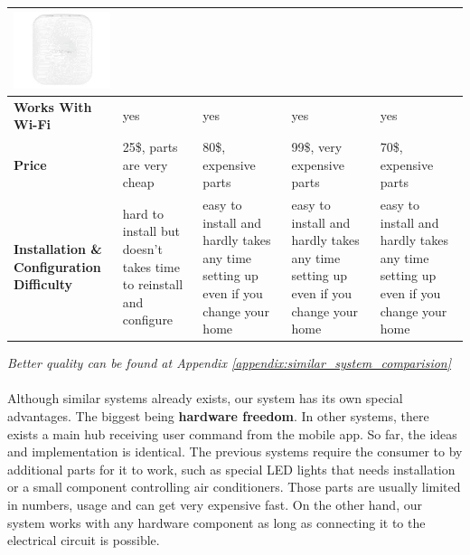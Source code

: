 \documentclass[12pt, oneside, a4paper]{book}
\newcommand\boldcolor[1]{\textcolor{bold}{\textbf{#1}}}
\begin{document}
\begin{table}[H]
\begin{center}
\begin{tabularx}{1\linewidth}{|m{2.2cm}*4{|X}|}
						\includegraphics[width=\linewidth]{img/samsung_hw.png}
					 \\\hline
					\boldcolor{Works With Wi-Fi} & yes & yes & yes & yes  \\\hline

					\boldcolor{Price} & 25\$, parts are very cheap & 80\$, expensive parts & 99\$, very expensive parts & 70\$, expensive parts \\\hline
					
					\boldcolor{Installation \& Configuration Difficulty} & hard to install but doesn't takes time to reinstall and configure& easy to install and hardly takes any time setting up even if you change your home  & easy to install and hardly takes any time setting up even if you change your home  & easy to install and hardly takes any time setting up even if you change your home
					\\\hline
				\end{tabularx}
			\end{center}
		\end{table}
		\textit{Better quality can be found at Appendix \ref{appendix:similar_system_comparision}}
		\newpage
		\paragraph{} Although similar systems already exists, our system has its own special advantages. The biggest being \textbf{hardware freedom}. In other systems, there exists a main hub receiving user command from the mobile app. So far, the ideas and implementation is identical. The previous systems require the consumer to by additional parts for it to work, such as special LED lights that needs installation or a small component controlling air conditioners. Those parts are usually limited in numbers, usage and can get very expensive fast. On the other hand, our system works with any hardware component as long as connecting it to the electrical circuit is possible.
\end{document}
